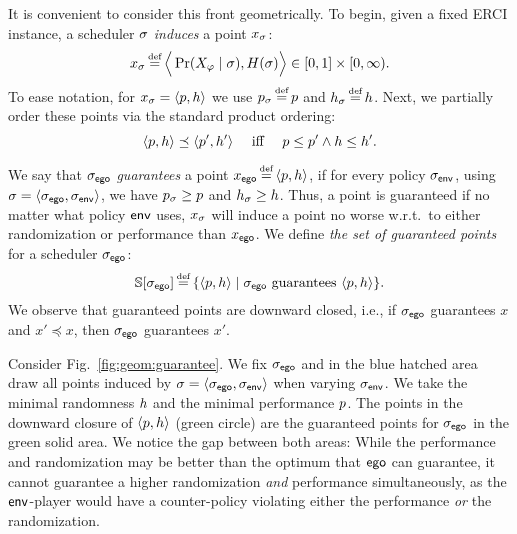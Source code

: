 It is convenient to consider this front geometrically.
To begin, given a fixed ERCI instance, a scheduler $\sigma$
\emph{induces} a point $x_\sigma$:
\begin{equation}
  x_\sched \eqdef \Big\langle \Pr(X_\varphi \mid \sched), H(\sched) \Big\rangle \in [0,1] \times [0,\infty).  
\end{equation}
To ease notation, for $x_\sigma = \langle p,h \rangle$ we use
$\scp_\sched \eqdef \scp$ and $\rndp_\sched \eqdef \rndp$. Next, we
partially order these points via the standard product ordering:
\begin{equation}
  \langle p,h \rangle \preceq \langle p',h' \rangle \quad\text{ iff }\quad p \leq p' \wedge h \leq h'.
\end{equation}

We say that ${\sigma_{\mathsf{ego}}}$ \emph{guarantees} a point $x_\pOne \eqdef
\langle \scp, \rndp \rangle$, if for every policy ${\sigma_{\mathsf{env}}}$, using
$\sigma = \langle {\sigma_{\mathsf{ego}}}, {\sigma_{\mathsf{env}}} \rangle$, we have
$p_\sigma \geq p$ and $h_\sigma \geq h$. Thus, a point
is guaranteed if no matter what policy $\mathsf{env}$ uses, $x_\sigma$ will
induce a point no worse w.r.t.\ to either randomization or performance
than $x_{\mathsf{ego}}$. 
We define
\emph{the set of guaranteed points} for a scheduler ${\sigma_{\mathsf{ego}}}$:
\begin{equation}\label{eq:guaranteed}
  \solutions[\pOneSched] \eqdef \{ \langle \scp, \rndp \rangle \mid  \pOneSched \text{ guarantees } \langle \scp, \rndp \rangle \}.
\end{equation}
We observe that guaranteed points are
downward closed, i.e., if ${\sigma_{\mathsf{ego}}}$ guarantees $x$ and $x' \preceq x$,
then ${\sigma_{\mathsf{ego}}}$ guarantees $x'$.
\begin{example}
Consider Fig.~\ref{fig:geom:guarantee}. We fix ${\sigma_{\mathsf{ego}}}$ and in the blue hatched area draw all points induced by $\sigma = \langle {\sigma_{\mathsf{ego}}}, {\sigma_{\mathsf{env}}} \rangle$ when varying ${\sigma_{\mathsf{env}}}$. We take the minimal randomness $h$ and the minimal performance $p$. The points in the downward closure  of $\langle p, h \rangle$ (green circle) are the guaranteed points for ${\sigma_{\mathsf{ego}}}$ in the green solid area.	
We notice the gap between both areas: While the performance and randomization may be better than the optimum that $\mathsf{ego}$ can guarantee, it cannot guarantee a higher randomization \emph{and} performance simultaneously, as  the $\mathsf{env}$-player would have a counter-policy violating either the performance \emph{or} the randomization.
\end{example}

